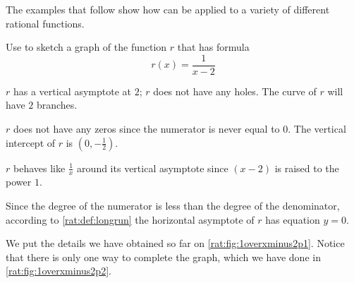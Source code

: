 The examples that follow show how  can be
applied to a variety of different rational functions.

\begin{pccexample}\label{rat:ex:1overxminus2p2}
	Use  to sketch a graph of the function $r$
	that has formula
	\[
		r(x)=\frac{1}{x-2}
	\]
	\begin{pccsolution}
		\begin{steps}
			\item $r$ has a vertical asymptote at $2$; $r$ does not have any holes. The curve of
			$r$ will have $2$ branches.
			\item $r$ does not have any zeros since the numerator is never equal to $0$. The
			vertical intercept of $r$ is $\left( 0,-\frac{1}{2} \right)$.
			\item $r$ behaves like $\frac{1}{x}$ around its vertical asymptote since $(x-2)$
			is raised to the power $1$.
			\item Since the degree of the numerator is less than the degree of the denominator,
			according to \vref{rat:def:longrun} the horizontal asymptote of $r$ has equation $y=0$.
			\item We put the details we have obtained so far on \cref{rat:fig:1overxminus2p1}. Notice
			that there is only one way to complete the graph, which we have done in \cref{rat:fig:1overxminus2p2}.
		\end{steps}
	\end{pccsolution}
\end{pccexample}

